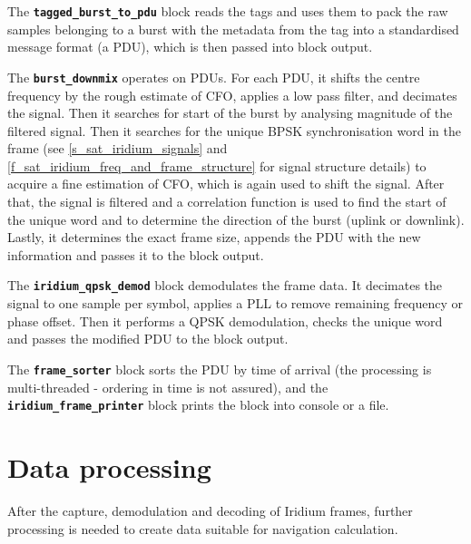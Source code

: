 The \textbf{\texttt{tagged\_burst\_to\_pdu}} block reads the tags and uses them to pack the raw samples belonging to a burst with the metadata from the tag into a standardised message format (a PDU), which is then passed into block output.

The \textbf{\texttt{burst\_downmix}} operates on PDUs. For each PDU, it shifts the centre frequency by the rough estimate of CFO, applies a low pass filter, and decimates the signal. Then it searches for start of the burst by analysing magnitude of the filtered signal. Then it searches for the unique BPSK synchronisation word in the frame (see  \autoref{s_sat_iridium_signals} and \autoref{f_sat_iridium_freq_and_frame_structure} for signal structure details) to acquire a fine estimation of CFO, which is again used to shift the signal. After that, the signal is filtered and a correlation function is used to find the start of the unique word and to determine the direction of the burst (uplink or downlink). Lastly, it determines the exact frame size, appends the PDU with the new information and passes it to the block output.

The \textbf{\texttt{iridium\_qpsk\_demod}} block demodulates the frame data. It decimates the signal to one sample per symbol, applies a PLL to remove remaining frequency or phase offset. Then it performs a QPSK demodulation, checks the unique word and passes the modified PDU to the block output.

The \textbf{\texttt{frame\_sorter}} block sorts the PDU by time of arrival (the processing is multi-threaded -  ordering in time is not assured), and the \textbf{\texttt{iridium\_frame\_printer}} block prints the block into console or a file.


\section{Data processing}
After the capture, demodulation and decoding of Iridium frames, further processing is needed to create data suitable for navigation calculation.


